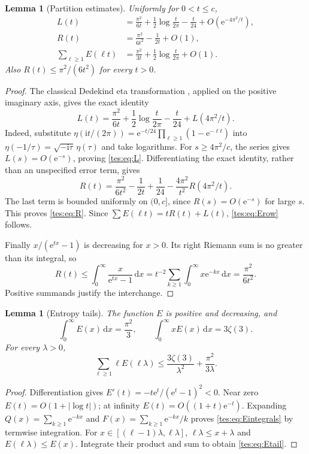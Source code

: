 \documentclass[11pt,a4paper]{article}
\newtheorem{lemma}[theorem]{Lemma}
\theoremstyle{remark}\newtheorem{remark}[theorem]{Remark}
\newcommand{\ee}{\mathrm e}\newcommand{\dd}{\,\mathrm d}
\numberwithin{equation}{section}
\begin{document}
\begin{lemma}[Partition estimates]\label{tes:lem:partition}
Uniformly for $0<t\le c$,
\begin{align}
L(t)&=\frac{\pi^2}{6t}+\frac12\log\frac{t}{2\pi}-\frac t{24}
+O(\ee^{-4\pi^2/t}),\label{tes:eq:L}\\
R(t)&=\frac{\pi^2}{6t^2}-\frac1{2t}+O(1),\label{tes:eq:R}\\
\sum_{\ell\ge1}E(\ell t)&=\frac{\pi^2}{3t}+\frac12\log\frac{t}{2\pi}+O(1).\label{tes:eq:Erow}
\end{align}
Also $R(t)\le\pi^2/(6t^2)$ for every $t>0$.
\end{lemma}
\begin{proof}
The classical Dedekind eta transformation \cite[\S23.18]{dlmf}, applied on the positive imaginary axis, gives the exact identity
\begin{equation}\label{tes:eq:modular}
L(t)=\frac{\pi^2}{6t}+\frac12\log\frac{t}{2\pi}-\frac t{24}
+L(4\pi^2/t).
\end{equation}
Indeed, substitute $\eta(\mathrm i t/(2\pi))=
\ee^{-t/24}\prod_{\ell\ge1}(1-\ee^{-\ell t})$ into
$\eta(-1/\tau)=\sqrt{-\mathrm i\tau}\,\eta(\tau)$ and take logarithms. For $s\ge4\pi^2/c$, the series gives $L(s)=O(\ee^{-s})$, proving \eqref{tes:eq:L}. Differentiating the exact identity, rather than an unspecified error term, gives
\[
R(t)=\frac{\pi^2}{6t^2}-\frac1{2t}+\frac1{24}
-\frac{4\pi^2}{t^2}R(4\pi^2/t).
\]
The last term is bounded uniformly on $(0,c]$, since $R(s)=O(\ee^{-s})$ for large $s$. This proves \eqref{tes:eq:R}. Since
$\sum E(\ell t)=tR(t)+L(t)$, \eqref{tes:eq:Erow} follows.

Finally $x/(\ee^{tx}-1)$ is decreasing for $x>0$. Its right Riemann sum is no greater than its integral, so
\[
R(t)\le\int_0^\infty\frac{x}{\ee^{tx}-1}\dd x
=t^{-2}\sum_{k\ge1}\int_0^\infty x\ee^{-kx}\dd x
=\frac{\pi^2}{6t^2}.
\]
Positive summands justify the interchange.
\end{proof}

\begin{lemma}[Entropy tails]\label{tes:lem:Etail}
The function $E$ is positive and decreasing, and
\begin{equation}\label{tes:eq:Eintegrals}
\int_0^\infty E(x)\dd x=\frac{\pi^2}{3},\qquad
\int_0^\infty xE(x)\dd x=3\zeta(3).
\end{equation}
For every $\lambda>0$,
\begin{equation}\label{tes:eq:Etail}
\sum_{\ell\ge1}\ell E(\ell\lambda)
\le\frac{3\zeta(3)}{\lambda^2}+\frac{\pi^2}{3\lambda}.
\end{equation}
\end{lemma}
\begin{proof}
Differentiation gives $E'(t)=-t\ee^t/(\ee^t-1)^2<0$. Near zero $E(t)=O(1+|\log t|)$; at infinity $E(t)=O((1+t)\ee^{-t})$. Expanding $Q(x)=\sum_{k\ge1}\ee^{-kx}$ and $F(x)=\sum_{k\ge1}\ee^{-kx}/k$ proves \eqref{tes:eq:Eintegrals} by termwise integration. For $x\in[(\ell-1)\lambda,\ell\lambda]$,
$\ell\lambda\le x+\lambda$ and $E(\ell\lambda)\le E(x)$. Integrate their product and sum to obtain \eqref{tes:eq:Etail}.
\end{proof}
\end{document}
